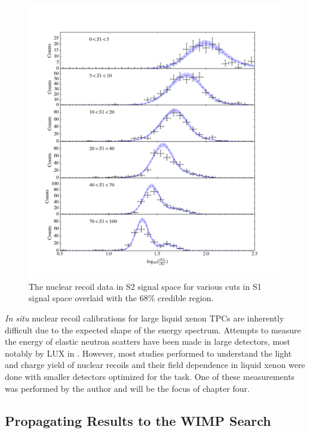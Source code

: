 \begin{figure}[p]
	\centering
	\includegraphics[width=0.99\textwidth]{xe1t_nr_results_s2_slices}
	\caption{The nuclear recoil data in S2 signal space for various cuts in S1 signal space overlaid with the 68\% credible region.}
	\label{fig:xe1t_nr_cal_s2_slices}
\end{figure}


\textit{In situ} nuclear recoil calibrations for large liquid xenon TPCs are inherently difficult due to the expected shape of the energy spectrum.  Attempts to measure the energy of elastic neutron scatters have been made in large detectors, most notably by LUX in .  However, most studies performed to understand the light and charge yield of nuclear recoils and their field dependence in liquid xenon were done with smaller detectors optimized for the task.  One of these measurements was performed by the author and will be the focus of chapter four.

\clearpage

\subsection{Propagating Results to the WIMP Search}
\label{sec:xe1t_propagating_results}


